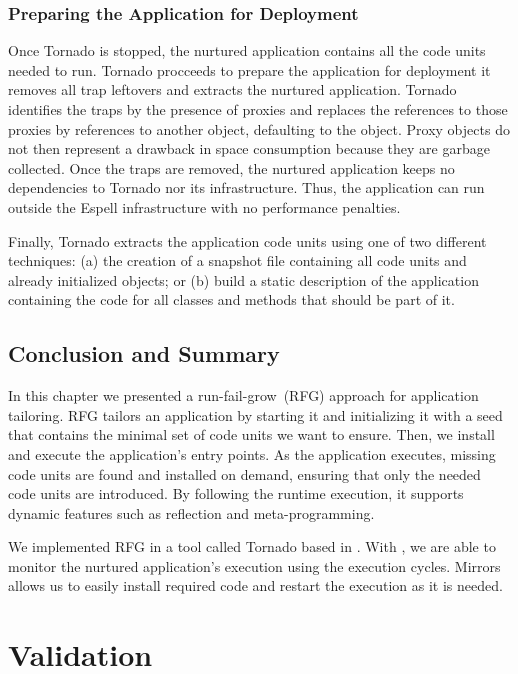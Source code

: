 \subsection{Preparing the Application for Deployment}\label{sec:deploy}

Once Tornado is stopped, the nurtured application contains all the code units needed to run. Tornado procceeds to prepare the application for deployment \ie it removes all trap leftovers and extracts the nurtured application. Tornado identifies the traps by the presence of proxies and replaces the references to those proxies by references to another object, defaulting to the  object. Proxy objects do not then represent a drawback in space consumption because they are garbage collected. Once the traps are removed, the nurtured application keeps no dependencies to Tornado nor its infrastructure. Thus, the application can run outside the Espell infrastructure with no performance penalties.

Finally, Tornado extracts the application code units using one of two different techniques: (a) the creation of a snapshot file containing all code units and already initialized objects; or (b) build a static description of the application containing the code for all classes and methods that should be part of it.

\section{Conclusion and Summary}

In this chapter we presented a run-fail-grow~(RFG) approach for application tailoring. RFG tailors an application by starting it and initializing it with a seed that contains the minimal set of code units we want to ensure. Then, we install and execute the application's entry points. As the application executes, missing code units are found and installed on demand, ensuring that only the needed code units are introduced. By following the runtime execution, it supports dynamic features such as reflection and meta-programming.

We implemented RFG in a tool called Tornado based in \Vtt. With \Vtt, we are able to monitor the nurtured application's execution using the execution cycles. Mirrors allows us to easily install required code and restart the execution as it is needed.

\chapter{Validation}
\minitoc
\introduction

